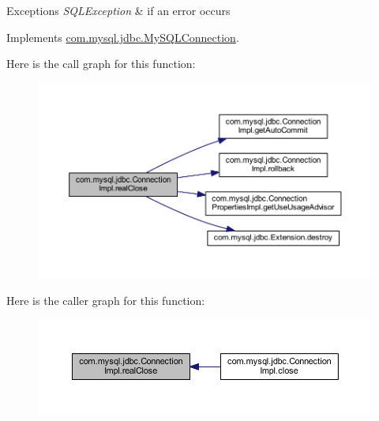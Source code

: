 \begin{DoxyExceptions}{Exceptions}
{\em S\+Q\+L\+Exception} & if an error occurs \\
\hline
\end{DoxyExceptions}


Implements \mbox{\hyperlink{interfacecom_1_1mysql_1_1jdbc_1_1_my_s_q_l_connection}{com.\+mysql.\+jdbc.\+My\+S\+Q\+L\+Connection}}.

Here is the call graph for this function\+:\nopagebreak
\begin{figure}[H]
\begin{center}
\leavevmode
\includegraphics[width=350pt]{classcom_1_1mysql_1_1jdbc_1_1_connection_impl_a644a18de5be3f4793ed1e97834fea266_cgraph}
\end{center}
\end{figure}
Here is the caller graph for this function\+:\nopagebreak
\begin{figure}[H]
\begin{center}
\leavevmode
\includegraphics[width=350pt]{classcom_1_1mysql_1_1jdbc_1_1_connection_impl_a644a18de5be3f4793ed1e97834fea266_icgraph}
\end{center}
\end{figure}
\mbox{\label{classcom_1_1mysql_1_1jdbc_1_1_connection_impl_afd89826eac9c9203016cb8044b0629d2}} 
